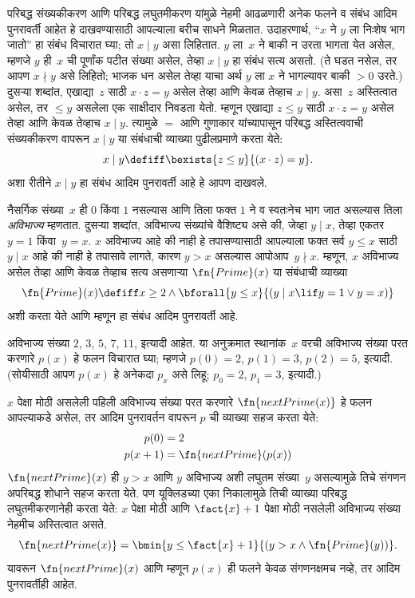 \documentclass[../../../include/open-logic-section]{subfiles}
\begin{document}

परिबद्ध संख्यकीकरण आणि परिबद्ध लघुतमीकरण यांमुळे नेहमी आढळणारी अनेक
फलने व संबंध आदिम पुनरावर्ती आहेत हे दाखवण्यासाठी आपल्याला बरीच साधने
मिळतात. उदाहरणार्थ, ``$x$ ने $y$ ला निःशेष भाग जातो'' हा संबंध विचारात
घ्या; तो $x \mid y$ असा लिहितात. $y$ ला~$x$ ने बाकी न उरता भागता येत
असेल, म्हणजे $y$ ही~$x$ ची पूर्णांक पटीत संख्या असेल, तेव्हा $x \mid y$
हा संबंध सत्य असतो. (ते घडत नसेल, तर आपण $x \nmid y$ असे लिहितो;
भाजक धन असेल तेव्हा याचा अर्थ $y$ ला $x$ ने भागल्यावर बाकी $> 0$ उरते.)
दुसऱ्या शब्दांत, एखाद्या~$z$ साठी $x \cdot z = y$ असेल तेव्हा आणि केवळ
तेव्हाच $x \mid y$. असा~$z$ अस्तित्वात असेल, तर $\leq y$ असलेला एक
साक्षीदार निवडता येतो. म्हणून एखाद्या $z \le y$ साठी $x \cdot z = y$
असेल तेव्हा आणि केवळ तेव्हाच $x \mid y$. त्यामुळे $=$ आणि गुणाकार
यांच्यापासून परिबद्ध अस्तित्ववाची संख्यकीकरण वापरून $x \mid y$ या संबंधाची
व्याख्या पुढीलप्रमाणे करता येते:
\[
x \mid y \defiff \bexists{z \leq y}{(x \cdot z) = y}.
\]
अशा रीतीने $x \mid y$ हा संबंध आदिम पुनरावर्ती आहे हे आपण दाखवले.

नैसर्गिक संख्या~$x$ ही $0$ किंवा $1$ नसल्यास आणि तिला फक्त $1$ ने व
स्वतःनेच भाग जात असल्यास तिला \emph{अविभाज्य} म्हणतात. दुसऱ्या शब्दांत,
अविभाज्य संख्यांचे वैशिष्ट्य असे की, जेव्हा $y \mid x$, तेव्हा एकतर
$y = 1$ किंवा~$y=x$. $x$ अविभाज्य आहे की नाही हे तपासण्यासाठी आपल्याला
फक्त सर्व $y \le x$ साठी $y \mid x$ आहे की नाही हे तपासावे लागते, कारण
$y > x$ असल्यास आपोआप~$y \nmid x$. म्हणून, $x$ अविभाज्य असेल तेव्हा आणि
केवळ तेव्हाच सत्य असणाऱ्या $\fn{Prime}(x)$ या संबंधाची व्याख्या
\[
\fn{Prime}(x) \defiff x \geq 2 \land \bforall{y \leq x}{(y \mid x \lif y
  = 1 \lor y = x)}
\]
अशी करता येते आणि म्हणून हा संबंध आदिम पुनरावर्ती आहे.

अविभाज्य संख्या $2$, $3$, $5$, $7$, $11$, इत्यादी आहेत. या अनुक्रमात
स्थानांक~$x$ वरची अविभाज्य संख्या परत करणारे $p(x)$ हे फलन विचारात घ्या;
म्हणजे $p(0) = 2$, $p(1) = 3$, $p(2) = 5$, इत्यादी. (सोयीसाठी आपण
$p(x)$ हे अनेकदा $p_x$ असे लिहू; $p_0=2$, $p_1=3$, इत्यादी.)

$x$ पेक्षा मोठी असलेली पहिली अविभाज्य संख्या परत करणारे
$\fn{nextPrime(x)}$ हे फलन आपल्याकडे असेल, तर आदिम पुनरावर्तन वापरून
$p$ ची व्याख्या सहज करता येते:
\begin{align*}
  p(0) & = 2\\
  p(x+1) & = \fn{nextPrime}(p(x))
\end{align*}
$\fn{nextPrime}(x)$ ही $y > x$ आणि $y$ अविभाज्य अशी लघुतम संख्या~$y$ असल्यामुळे
तिचे संगणन अपरिबद्ध शोधाने सहज करता येते. पण यूक्लिडच्या एका निकालामुळे
तिची व्याख्या परिबद्ध लघुतमीकरणानेही करता येते: $x$ पेक्षा मोठी आणि
$\fact{x}+1$ पेक्षा मोठी नसलेली अविभाज्य संख्या नेहमीच अस्तित्वात असते.
\[
  \fn{nextPrime(x)} =
  \bmin{y \leq \fact{x}+1}{(y > x \land \fn{Prime}(y))}.
\]
यावरून $\fn{nextPrime}(x)$ आणि म्हणून $p(x)$ ही फलने केवळ संगणनक्षमच नव्हे,
तर आदिम पुनरावर्तीही आहेत.
\end{document}

